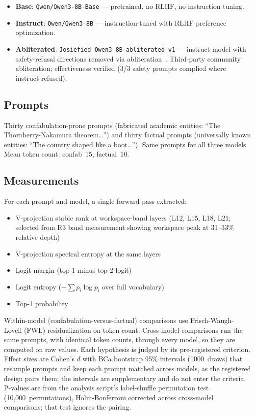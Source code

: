 \documentclass[11pt,a4paper]{article}
\begin{document}
\begin{itemize}[nosep]
\item \textbf{Base}: \texttt{Qwen/Qwen3-8B-Base} --- pretrained,
  no RLHF, no instruction tuning.
\item \textbf{Instruct}: \texttt{Qwen/Qwen3-8B} --- instruction-tuned
  with RLHF preference optimization.
\item \textbf{Abliterated}: \texttt{Josiefied-Qwen3-8B-abliterated-v1}
  --- instruct model with safety-refusal directions removed via
  abliteration~\citep{arditi2024refusal}. Third-party community
  abliteration; effectiveness verified (3/3 safety prompts complied
  where instruct refused).
\end{itemize}

\subsection{Prompts}

Thirty confabulation-prone prompts (fabricated academic entities:
``The Thornberry-Nakamura theorem\ldots'') and thirty factual prompts
(universally known entities: ``The country shaped like a boot\ldots'').
Same prompts for all three models. Mean token count: confab~15,
factual~10.

\subsection{Measurements}

For each prompt and model, a single forward pass extracted:
\begin{itemize}[nosep]
\item V-projection stable rank at workspace-band layers
  (L12, L15, L18, L21; selected from R3 band measurement showing
  workspace peak at 31--33\% relative depth)
\item V-projection spectral entropy at the same layers
\item Logit margin (top-1 minus top-2 logit)
\item Logit entropy ($-\sum p_i \log p_i$ over full vocabulary)
\item Top-1 probability
\end{itemize}

Within-model (confabulation-versus-factual) comparisons use
Frisch-Waugh-Lovell (FWL) residualization on token count. Cross-model
comparisons run the same prompts, with identical token counts, through
every model, so they are computed on raw values. Each hypothesis is
judged by its pre-registered criterion. Effect sizes are Cohen's $d$
with BCa bootstrap 95\% intervals (1000~draws) that resample prompts
and keep each prompt matched across models, as the registered design
pairs them; the intervals are supplementary and do not enter the
criteria. P-values are from the analysis script's label-shuffle
permutation test (10,000~permutations), Holm-Bonferroni corrected
across cross-model comparisons; that test ignores the pairing.
\end{document}
